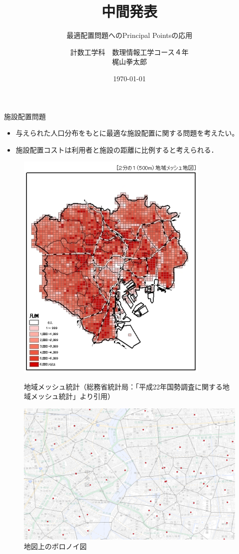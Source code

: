 \documentclass[unicode,11pt]{beamer}
\title{中間発表}
\subtitle{最適配置問題へのPrincipal Pointsの応用}
\author{計数工学科　数理情報工学コース４年\\梶山拳太郎}
\date{\today}
\institute{指導教員：松田孟留准教授}
\begin{document}
\begin{frame}
    \titlepage
\end{frame}

\begin{frame}{施設配置問題}
    \begin{itemize}
        \item 与えられた人口分布をもとに最適な施設配置に関する問題を考えたい。
        \item 施設配置コストは利用者と施設の距離に比例すると考えられる．
    \end{itemize}
    \begin{figure}[htbp]
        \begin{minipage}[b]{0.48\linewidth}
            \centering
            \includegraphics[keepaspectratio, scale=0.4]{tokyo_mesh_h22.jpeg}
            \caption{地域メッシュ統計（総務省統計局：「平成22年国勢調査に関する地域メッシュ統計」より引用）}
        \end{minipage}
        \begin{minipage}[b]{0.48\linewidth}
            \centering
            \includegraphics[keepaspectratio, scale=0.1]{Tokyo_Chuoku_Voronoi_2.png}
            \caption{地図上のボロノイ図}
        \end{minipage}
    \end{figure}
\end{frame}
\end{document}
